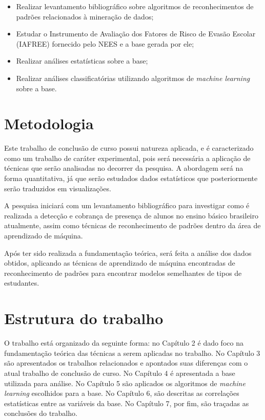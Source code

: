 		\begin{itemize}
            \item Realizar levantamento bibliográfico sobre algoritmos de reconhecimentos de padrões relacionados à mineração de dados;
			\item Estudar o Instrumento de Avaliação dos Fatores de Risco de Evasão Escolar (IAFREE) fornecido pelo NEES e a base gerada por ele;
            \item Realizar análises estatísticas sobre a base;
            \item Realizar análises classificatórias utilizando algoritmos de \textit{machine learning} sobre a base.
		\end{itemize}
	
	\section{Metodologia}
		\label{sec:Metodologia}

		Este trabalho de conclusão de curso possui natureza aplicada, e é caracterizado como um trabalho de caráter experimental, pois será necessária a aplicação de técnicas que serão analisadas no decorrer da pesquisa. A abordagem será na forma quantitativa, já que serão estudados dados estatísticos que posteriormente serão traduzidos em visualizações.

        A pesquisa iniciará com um levantamento bibliográfico para investigar como é realizada a detecção e cobrança de presença de alunos no ensino básico brasileiro atualmente, assim como técnicas de reconhecimento de padrões dentro da área de aprendizado de máquina.

        Após ter sido realizada a fundamentação teórica, será feita a análise dos dados obtidos, aplicando as técnicas de aprendizado de máquina encontradas de reconhecimento de padrões para encontrar modelos semelhantes de tipos de estudantes.


\section{Estrutura do trabalho}

O trabalho está organizado da seguinte forma: no Capítulo 2 é dado foco na fundamentação teórica das técnicas a serem aplicadas no trabalho. No Capítulo 3 são apresentados os trabalhos relacionados e apontados suas diferenças com o atual trabalho de conclusão de curso. No Capítulo 4 é apresentada a base utilizada para análise. No Capítulo 5 são aplicados os algoritmos de \textit{machine learning} escolhidos para a base. No Capítulo 6, são descritas as correlações estatísticas entre as variáveis da base. No Capítulo 7, por fim, são traçadas as conclusões do trabalho.